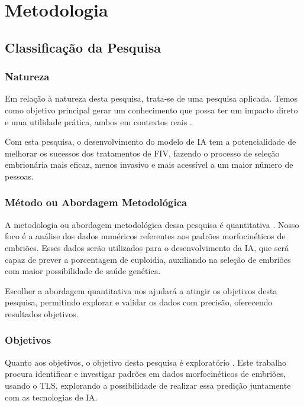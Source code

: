\chapter[Metodologia]{Metodologia}

\section{Classificação da Pesquisa}

\subsection{Natureza}

Em relação à natureza desta pesquisa, trata-se de uma pesquisa aplicada. Temos como objetivo principal gerar um conhecimento que possa ter um impacto direto e uma utilidade prática, ambos em contextos reais \cite{nascimento2016}. 

Com esta pesquisa, o desenvolvimento do modelo de IA tem a potencialidade de melhorar os sucessos dos tratamentos de FIV, fazendo o processo de seleção embrionária mais eficaz, menos invasivo e mais acessível a um maior número de pessoas.

\subsection{Método ou Abordagem Metodológica}

A metodologia ou abordagem metodológica dessa pesquisa é quantitativa \cite{nascimento2016}. Nosso foco é a análise dos dados numéricos referentes aos padrões morfocinéticos de embriões. Esses dados serão utilizados para o desenvolvimento da IA, que será capaz de prever a porcentagem de euploidia, auxiliando na seleção de embriões com maior possibilidade de saúde genética.

Escolher a abordagem quantitativa nos ajudará a atingir os objetivos desta pesquisa, permitindo explorar e validar os dados com precisão, oferecendo resultados objetivos. 

\subsection{Objetivos}

Quanto aos objetivos, o objetivo desta pesquisa é exploratório \cite{nascimento2016}. Este trabalho procura identificar e investigar padrões em dados morfocinéticos de embriões, usando o TLS, explorando a possibilidade de realizar essa predição juntamente com as tecnologias de IA.

